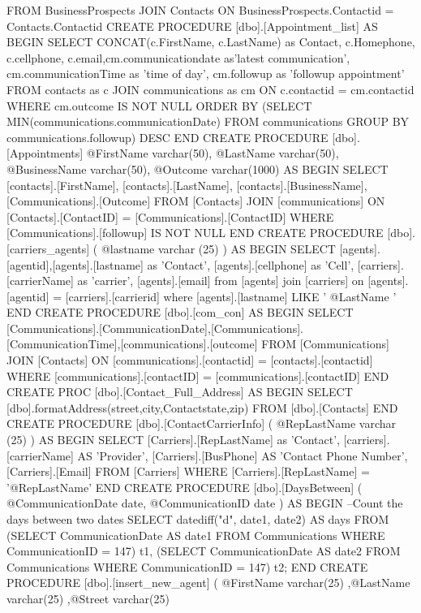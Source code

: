 	FROM BusinessProspects
	JOIN Contacts
	 ON BusinessProspects.Contactid = Contacts.Contactid
CREATE PROCEDURE [dbo].[Appointment_list] AS BEGIN
SELECT CONCAT(c.FirstName, c.LastName) as Contact, c.Homephone, c.cellphone, c.email,cm.communicationdate as'latest communication', cm.communicationTime as 'time of day', cm.followup as 'followup appointment'
  FROM  contacts as c
  JOIN communications as cm
		ON c.contactid = cm.contactid
WHERE cm.outcome IS NOT NULL 
ORDER BY (SELECT MIN(communications.communicationDate) FROM communications GROUP BY communications.followup) DESC
END
CREATE PROCEDURE [dbo].[Appointments]
@FirstName varchar(50),
@LastName varchar(50),
@BusinessName varchar(50),
@Outcome varchar(1000) AS BEGIN
SELECT [contacts].[FirstName], [contacts].[LastName], [contacts].[BusinessName],[Communications].[Outcome] FROM [Contacts]
JOIN [communications]
   ON [Contacts].[ContactID] = [Communications].[ContactID]
WHERE [Communications].[followup]  IS NOT NULL
END
CREATE PROCEDURE [dbo].[carriers_agents]
(
@lastname varchar (25)
) AS BEGIN
SELECT [agents].[agentid],[agents].[lastname] as 'Contact', [agents].[cellphone] as 'Cell', [carriers].[carrierName] as 'carrier', [agents].[email]
from [agents]
join [carriers]
	on [agents].[agentid] = [carriers].[carrierid]
	where [agents].[lastname] LIKE '	@LastName	'
END
CREATE PROCEDURE [dbo].[com_con] 
AS BEGIN
SELECT [Communications].[CommunicationDate],[Communications].[CommunicationTime],[communications].[outcome] 
FROM [Communications]
JOIN [Contacts]
	ON [communications].[contactid] = [contacts].[contactid]
WHERE [communications].[contactID] = [communications].[contactID]
END
CREATE PROC [dbo].[Contact_Full_Address]
AS BEGIN
SELECT [dbo].formatAddress(street,city,Contactstate,zip) FROM [dbo].[Contacts]
END
CREATE PROCEDURE [dbo].[ContactCarrierInfo]
(
@RepLastName varchar (25)
) AS BEGIN
SELECT [Carriers].[RepLastName] as 'Contact', [carriers].[carrierName] AS 'Provider', [Carriers].[BusPhone] AS 'Contact Phone Number', [Carriers].[Email]
FROM [Carriers]
	WHERE [Carriers].[RepLastName] = '@RepLastName'
END
CREATE PROCEDURE [dbo].[DaysBetween]
	(
		@CommunicationDate date,
		@CommunicationID date
	) AS BEGIN
--Count the days between two dates
SELECT datediff("d", date1, date2) AS days
FROM 
	(SELECT CommunicationDate AS date1
		FROM Communications
		WHERE CommunicationID = 147) t1,
	(SELECT CommunicationDate AS date2
		FROM Communications
		WHERE CommunicationID = 147) t2;
END
CREATE PROCEDURE [dbo].[insert_new_agent]			
(			
    @FirstName varchar(25)			
           ,@LastName varchar(25)			
           ,@Street varchar(25)			
